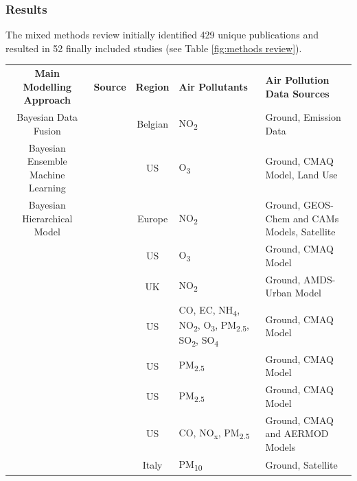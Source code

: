 \subsubsection{Results}
The mixed methods review initially identified 429 unique publications and resulted in 52 finally included studies (see Table \ref{fig:methods review}). 

\begin{landscape}
\begin{longtable}{c p{4cm} c p{4cm} p{6cm}}
\textbf{Main Modelling Approach} & \textbf{Source} & \textbf{Region} & \textbf{Air Pollutants} & \textbf{Air Pollution Data Sources} \\

 Bayesian Data Fusion & \cite{Fasbender2009BayesianBelgium} & Belgian & NO\textsubscript{2} & Ground, Emission Data  \\

 Bayesian Ensemble Machine Learning & \cite{Ren2022FlexibleConcentrations} & US & O\textsubscript{3} & Ground, CMAQ Model, Land Use \\

 Bayesian Hierarchical Model & \cite{Beloconi2020BayesianModels} & Europe & NO\textsubscript{2} & Ground, GEOS-Chem and CAMs Models, Satellite  \\
 
 & \cite{Berrocal2010AMisalignment} & US & O\textsubscript{3} & Ground, CMAQ Model  \\

 & \cite{Blangiardo2016Two-stagePrescriptions} & UK & NO\textsubscript{2} & Ground, AMDS-Urban Model  \\

 & \cite{Boaz2019MultivariateMissingness} & US & CO, EC, NH\textsubscript{4}, NO\textsubscript{2}, O\textsubscript{3}, PM\textsubscript{2.5}, SO\textsubscript{2}, SO\textsubscript{4} & Ground, CMAQ Model  \\

  & \cite{Braggio2022NewHospitalizationsb} & US & PM\textsubscript{2.5} & Ground, CMAQ Model \\

 & \cite{Choi2009MultivariateParticles} & US & PM\textsubscript{2.5} & Ground, CMAQ Model  \\

  & \cite{Crooks2013AFieldb} & US & CO, NO\textsubscript{x}, PM\textsubscript{2.5}  & Ground, CMAQ and AERMOD Models  \\

  & \cite{Fioravanti2021Spatio-temporalApproachb} & Italy & PM\textsubscript{10} & Ground, Satellite  \\
  

\end{longtable}
\end{landscape}
